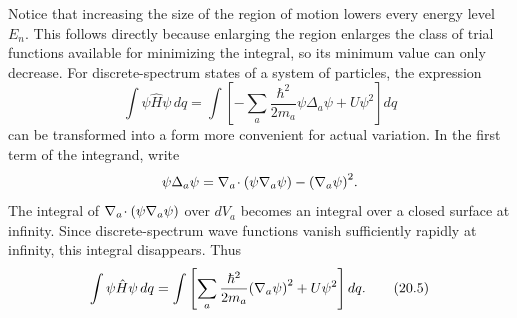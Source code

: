 Notice that increasing the size of the region of motion lowers every energy
level $E_n$. This follows directly because enlarging the region enlarges the
class of trial functions available for minimizing the integral, so its
minimum value can only decrease. For discrete-spectrum states of a system of
particles, the expression
\[
  \int\psi\hat H\psi\,dq
  =\int\left[-\sum_a\frac{\hbar^2}{2m_a}\psi\Delta_a\psi
  +U\psi^2\right]dq
\]
can be%
transformed into a form more convenient for actual variation. In the first
term of the integrand, write
\[
  \psi\Delta_a\psi
  =\nabla_{a}\!\cdot (\psi\nabla_{a} \psi)
  -{\left(\nabla_{a} \psi\right)}^2.
\]
The integral of $\nabla_{a}\!\cdot (\psi\nabla_{a} \psi)$ over $dV_a$ becomes an integral
over a closed surface at infinity. Since discrete-spectrum wave functions
vanish sufficiently rapidly at infinity, this integral disappears. Thus
\begin{equation}
  \int\psi\hat H\psi\,dq
  =\int\left[\sum_a\frac{\hbar^2}{2m_a}
  {\left(\nabla_{a} \psi\right)}^2
  +U\psi^2\right]dq.
  \tag{20.5}
\end{equation}
